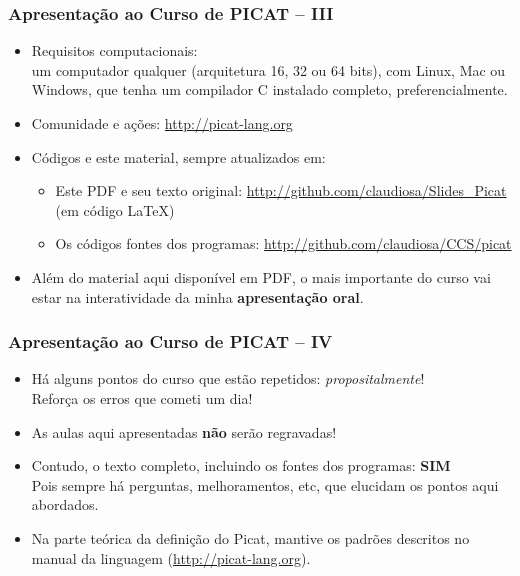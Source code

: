     
\begin{frame}[fragile]
  \frametitle{Apresentação ao Curso de PICAT -- III}
  \begin{itemize}

						
    \item Requisitos computacionais:\\
    \pause
    um computador qualquer (arquitetura 16, 32 ou 64 bits), com Linux, Mac ou Windows,
    que tenha um compilador C instalado completo, preferencialmente.

    \item Comunidade e ações: \url{http://picat-lang.org}
    
    \pause
    \item Códigos e este material, sempre atualizados em: 

    \pause
    \begin{itemize}
      \item  Este PDF e seu texto original:  \url{http://github.com/claudiosa/Slides_Picat} (em código \LaTeX)
     \item   Os códigos fontes dos programas:  \url{http://github.com/claudiosa/CCS/picat}
    \end{itemize}

			\item Além do material aqui disponível em PDF, o mais importante  do curso
			 vai estar na interatividade
			da minha \textbf{apresentação oral}. 
			
    
  \end{itemize}

\end{frame}

    
\begin{frame}[fragile]
  \frametitle{Apresentação ao Curso de PICAT -- IV}
  \begin{itemize}

    \item Há alguns pontos do curso que estão repetidos: \textit{propositalmente}!\\
    \pause
    Reforça os erros que cometi um dia!

    \pause
    \item As aulas aqui apresentadas \textbf{não} serão regravadas!
        
    \pause 
    \item Contudo, o texto completo, incluindo os fontes dos programas: \textbf{SIM}\\
    Pois sempre há perguntas, melhoramentos, etc, que elucidam os pontos aqui abordados.
    
    \pause 
    \item Na parte teórica da definição do Picat, mantive os padrões 
    descritos no manual da linguagem (\url{http://picat-lang.org}).
    
  \end{itemize}

\end{frame}





